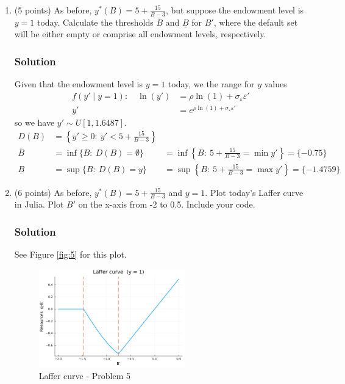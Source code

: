 \documentclass[12pt]{article}
\begin{document}
\begin{enumerate}
\begin{enumerate}
        \item (5 points) As before, $y^*(B) = 5 + \frac{15}{B - 3}$, but suppose the endowment level is $y = 1$ today. Calculate the thresholds $\bar{B}$ and $\underline{B}$ for $B'$, where the default set will be either empty or comprise all endowment levels, respectively.
        \subsubsection*{Solution}

        Given that  the endowment level is $y = 1$ today, we the range for $y$ values 
        \begin{align*}
            f(y' \mid y = 1): \quad  \ln(y') &= \rho \ln(1) + \sigma_\varepsilon \varepsilon'
            \\ y'&= e^{\rho \ln(1) + \sigma_\varepsilon \varepsilon'}
        \end{align*}
        so we have $y' \sim U[1,1.6487]$.
        \begin{align*}
        D(B) &= \left\{ y' \geq 0 : \ y' < 5 + \frac{15}{B - 3} \right\}
           \\  \bar{B} &= \inf \{ B: \  D(B)=\emptyset\} 
           &= \inf\left\{ B: \ 5+\frac{15}{B-3} = \min y' \right\}
           = \{ -0.75\} 
\\            \underline{B} &= \sup \{ B: \  D(B)=y\} 
             &=  \sup\left\{ B: \ 5+\frac{15}{B-3} = \max y'  \right\} = \{ -1.4759\} 
        \end{align*}

        \item (6 points) As before, $y^*(B) = 5 + \frac{15}{B - 3}$ and $y = 1$. Plot today’s Laffer curve in Julia. Plot $B'$ on the x-axis from -2 to 0.5. Include your code.
        \subsubsection*{Solution}

        See Figure \eqref{fig:5} for this plot.
    \begin{figure}[h]
            \centering
                \includegraphics[width=0.6\textwidth]{pset2/q5.png}
                \caption{Laffer curve - Problem 5}
                \label{fig:5}
        \end{figure}


\end{enumerate}
\end{enumerate}
\end{document}

